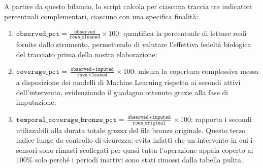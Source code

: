A partire da questo bilancio, lo script calcola per ciascuna traccia tre indicatori percentuali complementari, ciascuno con una specifica finalit\`a:
\begin{enumerate}
    \item $\texttt{observed\_pct} = \frac{\texttt{observed}}{\texttt{rows\_cleaned}} \times 100$: quantifica la percentuale di letture reali fornite dallo strumento, permettendo di valutare l'effettiva fedelt\`a biologica del tracciato prima della nostra elaborazione;
    \item $\texttt{coverage\_pct} = \frac{\texttt{observed} + \texttt{imputed}}{\texttt{rows\_cleaned}} \times 100$: misura la copertura complessiva messa a disposizione dei modelli di Machine Learning rispetto ai secondi attivi dell'intervento, evidenziando il guadagno ottenuto grazie alla fase di imputazione;
    \item $\texttt{temporal\_coverage\_bronze\_pct} = \frac{\texttt{observed} + \texttt{imputed}}{\texttt{rows\_original}} \times 100$: rapporta i secondi utilizzabili alla durata totale grezza del file bronze originale. Questo terzo indice funge da controllo di sicurezza: evita infatti che un intervento in cui i sensori sono rimasti scollegati per quasi tutta l'operazione appaia coperto al $100\%$ solo perch\'e i periodi inattivi sono stati rimossi dalla tabella pulita.
\end{enumerate}


